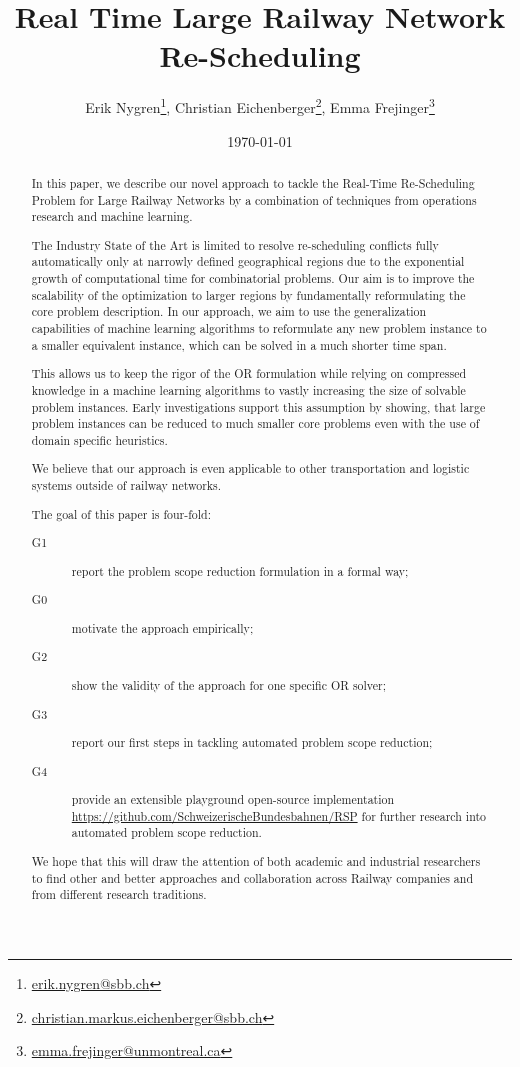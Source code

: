 \documentclass{article}
\title{Real Time Large Railway Network Re-Scheduling}
\author{Erik Nygren\footnote{\url{erik.nygren@sbb.ch}}, Christian Eichenberger\footnote{\url{christian.markus.eichenberger@sbb.ch}}, Emma Frejinger\footnote{\url{emma.frejinger@unmontreal.ca}}}
\date{\today}
\begin{document}
\maketitle

\tableofcontents
\newpage
\begin{abstract}
In this paper, we describe our novel approach to tackle the Real-Time Re-Scheduling Problem for Large Railway Networks by a combination of techniques from operations research and machine learning.

The Industry State of the Art is limited to resolve re-scheduling conflicts fully automatically only at narrowly defined geographical regions due to the exponential growth of computational time for combinatorial problems. Our aim is to improve the scalability of the optimization to larger regions by fundamentally reformulating the core problem description. In our approach, we aim to use the generalization capabilities of machine learning algorithms to reformulate any new problem instance to a smaller equivalent instance, which can be solved in a much shorter time span.

This allows us to keep the rigor of the OR formulation while relying on compressed knowledge in a machine learning algorithms to vastly increasing the size of solvable problem instances.
Early investigations support this assumption by showing, that large problem instances can be reduced to much smaller core problems even with the use of domain specific heuristics.

We believe that our approach is even applicable to other transportation and logistic systems outside of railway networks.

The goal of this paper is four-fold:
\begin{description}
\item[G1] report the problem scope reduction formulation in a formal way;
\item[G0] motivate the approach empirically;
\item[G2] show the validity of the approach for one specific OR solver;
\item[G3] report our first steps in tackling automated problem scope reduction;
\item[G4] provide an extensible playground open-source implementation \url{https://github.com/SchweizerischeBundesbahnen/RSP} for further research into automated problem scope reduction.
\end{description}
 We hope that this will draw the attention of both academic and industrial researchers to find other and better approaches and collaboration across Railway companies and from different research traditions.
\end{abstract}
\end{document}
